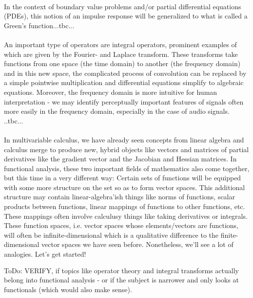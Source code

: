\paragraph{}
In the context of boundary value problems and/or partial differential equations (PDEs), this notion of an impulse response will be generalized to what is called a Green's function...tbc...

\paragraph{}
An important type of operators are integral operators, prominent examples of which are given by the Fourier- and Laplace transform. These transforms take functions from one space (the time domain) to another (the frequency domain) and in this new space, the complicated process of convolution can be replaced by a simple pointwise multiplication and differential equations simplify to algebraic equations. Moreover, the frequency domain is more intuitive for human interpretation - we may identify perceptually important features of signals often more easily in the frequency domain, especially in the case of audio signals.
..tbc...

\paragraph{}
In multivariable calculus, we have already seen concepts from linear algebra and calculus merge to produce new, hybrid objects like vectors and matrices of partial derivatives like the gradient vector and the Jacobian and Hessian matrices. In functional analysis, these two important fields of mathematics also come together, but this time in a very different way: Certain sets of functions will be equipped with some more structure on the set so as to form vector spaces. This additional structure may contain linear-algebra'ish things like norms of functions, scalar products between functions, linear mappings of functions to other functions, etc. These mappings often involve calculusy things like taking derivatives or integrals. These function spaces, i.e. vector spaces whose elements/vectors are functions, will often be infinite-dimensional which is a qualitative difference to the finite-dimensional vector spaces we have seen before. Nonetheless, we'll see a lot of analogies. Let's get started!

\medskip
ToDo: VERIFY, if topics like operator theory and integral transforms actually belong into functional analysis - or if the subject is narrower and only looks at functionals (which would also make sense).

